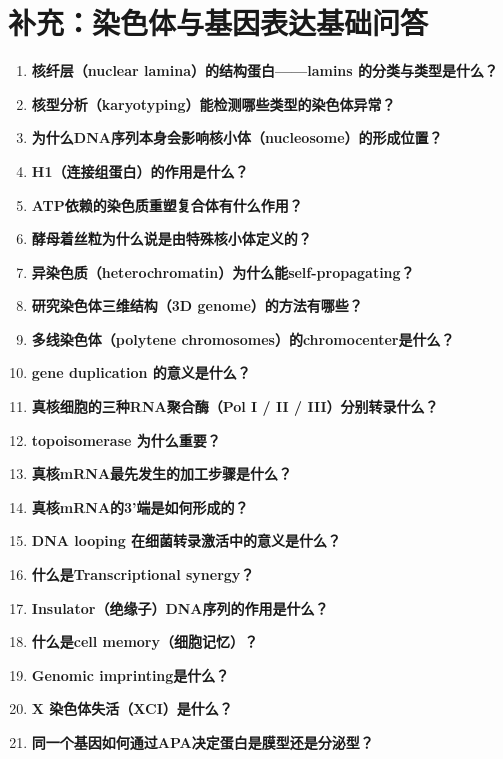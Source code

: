 \documentclass[12pt,fontset=none]{ctexart}
\begin{document}
\section*{补充：染色体与基因表达基础问答}
\begin{enumerate}
\item \textbf{核纤层（nuclear lamina）的结构蛋白——lamins 的分类与类型是什么？}

\item \textbf{核型分析（karyotyping）能检测哪些类型的染色体异常？}

\item \textbf{为什么DNA序列本身会影响核小体（nucleosome）的形成位置？}

\item \textbf{H1（连接组蛋白）的作用是什么？}

\item \textbf{ATP依赖的染色质重塑复合体有什么作用？}

\item \textbf{酵母着丝粒为什么说是由特殊核小体定义的？}

\item \textbf{异染色质（heterochromatin）为什么能self-propagating？}

\item \textbf{研究染色体三维结构（3D genome）的方法有哪些？}

\item \textbf{多线染色体（polytene chromosomes）的chromocenter是什么？}

\item \textbf{gene duplication 的意义是什么？}

\item \textbf{真核细胞的三种RNA聚合酶（Pol I / II / III）分别转录什么？}

\item \textbf{topoisomerase 为什么重要？}

\item \textbf{真核mRNA最先发生的加工步骤是什么？}

\item \textbf{真核mRNA的3'端是如何形成的？}

\item \textbf{DNA looping 在细菌转录激活中的意义是什么？}

\item \textbf{什么是Transcriptional synergy？}

\item \textbf{Insulator（绝缘子）DNA序列的作用是什么？}

\item \textbf{什么是cell memory（细胞记忆）？}

\item \textbf{Genomic imprinting是什么？}

\item \textbf{X 染色体失活（XCI）是什么？}

\item \textbf{同一个基因如何通过APA决定蛋白是膜型还是分泌型？}

\end{enumerate}
\end{document}
